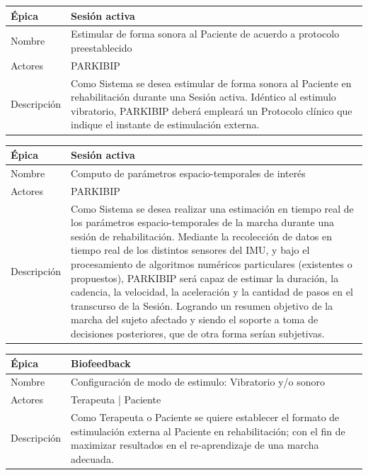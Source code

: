 \begin{table}[H] 
\centering
\begin{tabular}{| p{2cm} | p{10cm} |}
\hline
Épica & Sesión activa\\ \hline
Nombre & Estimular de forma sonora al Paciente de acuerdo a protocolo preestablecido\\ \hline
Actores & PARKIBIP\\ \hline
Descripción &  Como Sistema se desea estimular de forma sonora al Paciente en rehabilitación durante una Sesión activa. Idéntico al estimulo vibratorio, PARKIBIP deberá empleará un Protocolo clínico que indique el instante de estimulación externa.\\ \hline
\end{tabular}
\end{table}

\begin{table}[H] 
\centering
\begin{tabular}{| p{2cm} | p{10cm} |}
\hline
Épica & Sesión activa\\ \hline
Nombre & Computo de parámetros espacio-temporales de interés\\ \hline
Actores & PARKIBIP\\ \hline
Descripción & Como Sistema se desea realizar una estimación en tiempo real de los parámetros espacio-temporales de la marcha durante una sesión de rehabilitación. Mediante la recolección de datos en tiempo real de los distintos sensores del IMU, y bajo el procesamiento de algoritmos numéricos particulares (existentes o propuestos), PARKIBIP será capaz de estimar la duración, la cadencia, la velocidad, la aceleración y la cantidad de pasos en el transcurso de la Sesión. Logrando un resumen objetivo de la marcha del sujeto afectado y siendo el soporte a toma de decisiones posteriores, que de otra forma serían subjetivas.\\ \hline
\end{tabular}
\end{table}

\begin{table}[H] 
\centering
\begin{tabular}{| p{2cm} | p{10cm} |}
\hline
Épica & Biofeedback\\ \hline
Nombre & Configuración de modo de estimulo: Vibratorio y/o sonoro\\ \hline
Actores & Terapeuta | Paciente\\ \hline
Descripción & Como Terapeuta o Paciente se quiere establecer el formato de estimulación externa al Paciente en rehabilitación; con el fin de maximizar resultados en el re-aprendizaje de una marcha adecuada. \\ \hline
\end{tabular}
\end{table}

